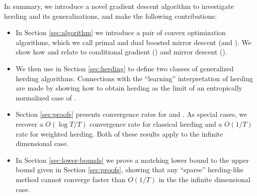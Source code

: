 \documentclass[paper.tex]{subfiles}
\begin{document}
In summary, we introduce a novel gradient descent algorithm to investigate herding and its generalizations, and make the following contributions:
\begin{itemize}
\item In Section \ref{sec:algorithm} we introduce a pair of convex optimization algorithms, which we call primal and dual boosted mirror descent (\primal and \dual). We show how \primal and \dual relate to conditional gradient (\cgd) and mirror descent (\md). 
\item We then use \dual in Section \ref{sec:herding} to define two classes of generalized herding algorithms. Connections with the ``learning'' interpretation of herding are made by showing how to obtain herding as the limit of an entropically normalized case of \dual. 
\item Section \ref{sec:proofs} presents convergence rates for \primal and \dual. As special cases, we recover a $O(\log T/ T)$ convergence rate for classical herding and a $O(1/T)$ rate for weighted herding. Both of these results apply to the infinite dimensional case. 
\item In Section \ref{sec:lower-bounds} we prove a matching lower bound to the upper bound given in Section \ref{sec:proofs}, showing that any ``sparse'' herding-like method cannot converge faster than $O(1/T)$ in the the infinite dimensional case.%
\end{itemize}
\end{document}
